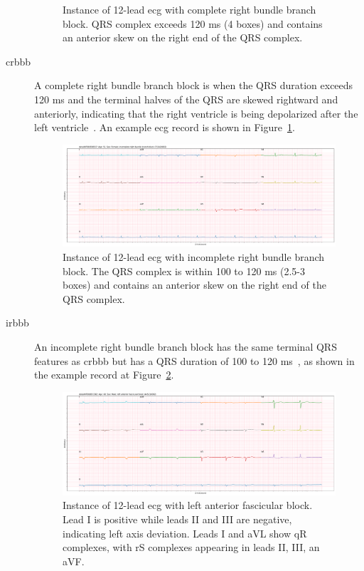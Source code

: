 \documentclass[\main/thesis.tex]{subfiles}
\begin{document}
\begin{description}
\begin{figure}
        \caption{Instance of 12-lead \gls{ecg} with complete right bundle branch block. QRS complex exceeds 120 ms (4 boxes) and contains an anterior skew on the right end of the QRS complex.}
        \label{fig:full_CRBBB}
    \end{figure} 
    \item[\gls{crbbb}] A complete right bundle branch block is when the QRS duration exceeds 120 ms and the terminal halves of the QRS are skewed rightward and anteriorly, indicating that the right ventricle is being depolarized after the left ventricle~\cite{ecg-utah-lesson}. An example \gls{ecg} record is shown in Figure~\ref{fig:full_CRBBB}.
    \begin{figure}
        \centering
        \includegraphics[width=14cm]{figure/IRBBB/full_28_18884.pdf}
        \caption{Instance of 12-lead \gls{ecg} with incomplete right bundle branch block. The QRS complex is within 100 to 120 ms (2.5-3 boxes) and contains an anterior skew on the right end of the QRS complex.}
        \label{fig:full_IRBBB}
    \end{figure} 
    \item[\gls{irbbb}] An incomplete right bundle branch block has the same terminal QRS features as \gls{crbbb} but has a QRS duration of 100 to 120 ms~\cite{ecg-utah-lesson}, as shown in the example record at Figure~\ref{fig:full_IRBBB}.
    \begin{figure}
        \centering
        \includegraphics[width=14cm]{figure/LAnFB/full_3_11709.pdf}
        \caption{Instance of 12-lead \gls{ecg} with left anterior fascicular block. Lead I is positive while leads II and III are negative, indicating left axis deviation. Leads I and aVL show qR complexes, with rS complexes appearing in leads II, III, an aVF.}

\end{figure}
\end{description}
\end{document}
